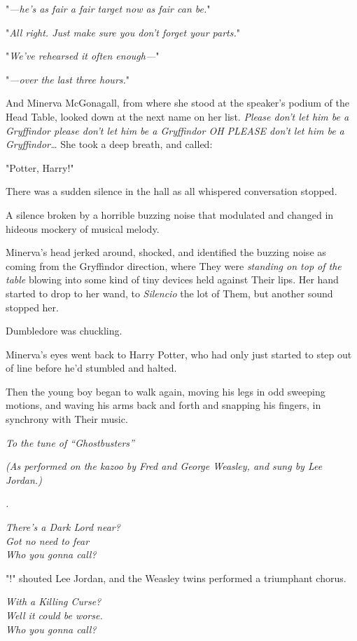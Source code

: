 "\emph{---he's as fair a fair target now as fair can be.}"

"\emph{All right. Just make sure you don't forget your parts.}"

"\emph{We've rehearsed it often enough---}"

"\emph{---over the last three hours.}"

And Minerva McGonagall, from where she stood at the speaker's podium of the 
Head Table, looked down at the next name on her list. \emph{Please don't let 
him be a Gryffindor please don't let him be a Gryffindor OH PLEASE don't let 
him be a Gryffindor{\ldots}} She took a deep breath, and called:

"Potter, Harry!"

There was a sudden silence in the hall as all whispered conversation stopped.

A silence broken by a horrible buzzing noise that modulated and changed in 
hideous mockery of musical melody.

Minerva's head jerked around, shocked, and identified the buzzing noise as 
coming from the Gryffindor direction, where They were \emph{standing on top of 
the table} blowing into some kind of tiny devices held against Their lips. Her 
hand started to drop to her wand, to \emph{Silencio} the lot of Them, but 
another sound stopped her.

Dumbledore was chuckling.

Minerva's eyes went back to Harry Potter, who had only just started to step out 
of line before he'd stumbled and halted.

Then the young boy began to walk again, moving his legs in odd sweeping 
motions, and waving his arms back and forth and snapping his fingers, in 
synchrony with Their music.

\begin{center}
\emph{To the tune of ``Ghostbusters''}

\emph{(As performed on the kazoo by Fred and George Weasley,
and sung by Lee Jordan.)}

\emph{.}

\emph{There's a Dark Lord near?\\
Got no need to fear\\
Who you gonna call?}
\end{center}

"!" shouted Lee Jordan, and the Weasley twins performed a 
triumphant chorus.

\begin{center}
\emph{With a Killing Curse?\\
Well it could be worse.\\
Who you gonna call?}
\end{center}

